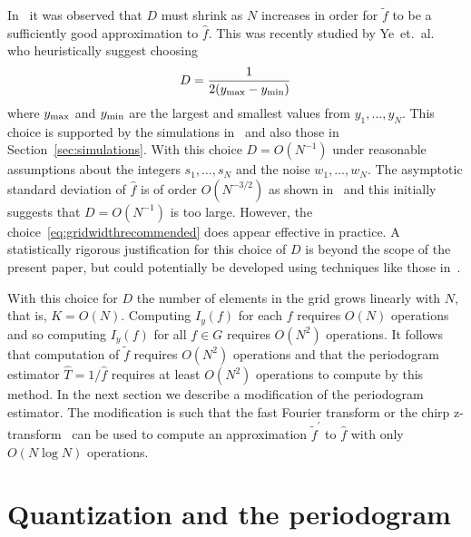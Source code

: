 \documentclass[10pt,twocolumn,twoside]{IEEEtran}
\begin{document}
In~\cite{McKilliam2007} it was observed that $D$ must shrink as $N$ increases in order for $\widetilde{f}$ to be a sufficiently good approximation to $\hat{f}$.  This was recently studied by Ye~et.~al.~\cite{Haohuan2013435,6492742} who heuristically suggest choosing
\begin{equation}\label{eq:gridwidthrecommended}
D = \frac{1}{2(y_{\text{max}} - y_{\text{min}})}
\end{equation}
where $y_{\text{max}}$ and $y_{\text{min}}$ are the largest and smallest values from $y_1,\dots,y_N$.  This choice is supported by the simulations in~\cite{Haohuan2013435,6492742} and also those in Section~\ref{sec:simulations}.  With this choice $D = O(N^{-1})$ under reasonable assumptions about the integers $s_1,\dots,s_N$ and the noise $w_1,\dots,w_N$.  The asymptotic standard deviation of $\hat{f}$ is of order $O(N^{-3/2})$ as shown in~\cite{Quinn20013asilomar_period_est} and this initially suggests that $D = O(N^{-1})$ is too large.  However, the choice~\eqref{eq:gridwidthrecommended} does appear effective in practice.  A statistically rigorous justification for this choice of $D$ is beyond the scope of the present paper, but could potentially be developed using techniques like those in~\cite{Quinn2008maximizing_the_periodogram}.

With this choice for $D$ the number of elements in the grid grows linearly with $N$, that is, $K = O(N)$.  Computing $I_y(f)$ for each $f$ requires $O(N)$ operations and so computing $I_y(f)$ for all $f \in G$ requires $O(N^2)$ operations.  It follows that computation of $\widetilde{f}$ requires $O(N^2)$ operations and that the periodogram estimator $\hat{T} = 1/\hat{f}$ requires at least $O(N^2)$ operations to compute by this method.  %
In the next section we describe a modification of the periodogram estimator.  The modification is such that the fast Fourier transform or the chirp z-transform~\cite{Rabiner1969} can be used to compute an approximation $\widetilde{f}^\prime$ to $\hat{f}$ with only $O(N\log N)$ operations.

\section{Quantization and the periodogram}\label{sec:quant-peri} 
\end{document}
